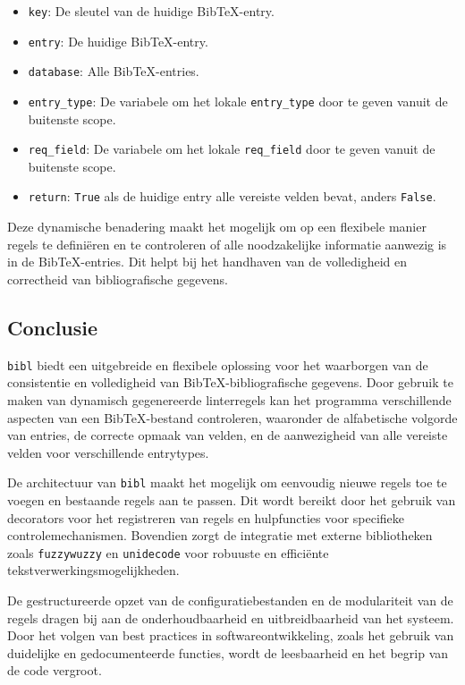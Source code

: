 \begin{itemize}
    \item \texttt{key}: De sleutel van de huidige BibTeX-entry.
    \item \texttt{entry}: De huidige BibTeX-entry.
    \item \texttt{database}: Alle BibTeX-entries.
    \item \texttt{entry\_type}: De variabele om het lokale \texttt{entry\_type} door te geven vanuit de buitenste scope.
    \item \texttt{req\_field}: De variabele om het lokale \texttt{req\_field} door te geven vanuit de buitenste scope.
    \item \texttt{return}: \texttt{True} als de huidige entry alle vereiste velden bevat, anders \texttt{False}.
\end{itemize}

Deze dynamische benadering maakt het mogelijk om op een flexibele manier regels te definiëren en te controleren of alle noodzakelijke informatie aanwezig is in de BibTeX-entries. Dit helpt bij het handhaven van de volledigheid en correctheid van bibliografische gegevens.

\subsection{Conclusie}

\texttt{bibl} biedt een uitgebreide en flexibele oplossing voor het waarborgen van de consistentie en volledigheid van BibTeX-bibliografische gegevens. Door gebruik te maken van dynamisch gegenereerde linterregels kan het programma verschillende aspecten van een BibTeX-bestand controleren, waaronder de alfabetische volgorde van entries, de correcte opmaak van velden, en de aanwezigheid van alle vereiste velden voor verschillende entrytypes.

De architectuur van \texttt{bibl} maakt het mogelijk om eenvoudig nieuwe regels toe te voegen en bestaande regels aan te passen. Dit wordt bereikt door het gebruik van decorators voor het registreren van regels en hulpfuncties voor specifieke controlemechanismen. Bovendien zorgt de integratie met externe bibliotheken zoals \texttt{fuzzywuzzy} en \texttt{unidecode} voor robuuste en efficiënte tekstverwerkingsmogelijkheden.

De gestructureerde opzet van de configuratiebestanden en de modulariteit van de regels dragen bij aan de onderhoudbaarheid en uitbreidbaarheid van het systeem. Door het volgen van best practices in softwareontwikkeling, zoals het gebruik van duidelijke en gedocumenteerde functies, wordt de leesbaarheid en het begrip van de code vergroot.

